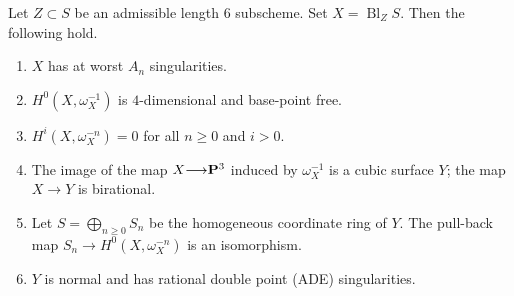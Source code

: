 \documentclass[12pt,reqno]{amsart}
\DeclareMathOperator{\Bl}{Bl}
\renewcommand{\to}{{\longrightarrow}}
\numberwithin{equation}{section}
\begin{document}
\begin{proposition}
  \label{prop:admissibleblowup}
Let $Z \subset S$ be an admissible length 6 subscheme.
Set $X = \Bl_ZS$.
Then the following hold.
\begin{enumerate}
\item $X$ has at worst $A_n$ singularities.
\item $H^0\left(X, \omega^{-1}_X\right)$ is $4$-dimensional and base-point free.
\item $H^i(X,\omega_X^{-n}) = 0$ for all $n \geq 0$ and $i > 0$.
\item The image of the map $X \to \P^3$ induced by $\omega_X^{-1}$ is a cubic surface $Y$; the map $X \to Y$ is birational.
\item Let $S = \bigoplus_{n \geq 0} S_n$ be the homogeneous coordinate ring of $Y$.
  The pull-back map $S_n \to H^0\left(X, \omega_X^{-n}\right)$ is an isomorphism.
\item $Y$ is normal and has rational double point (ADE) singularities.
\end{enumerate}
\end{proposition}
\end{document}
